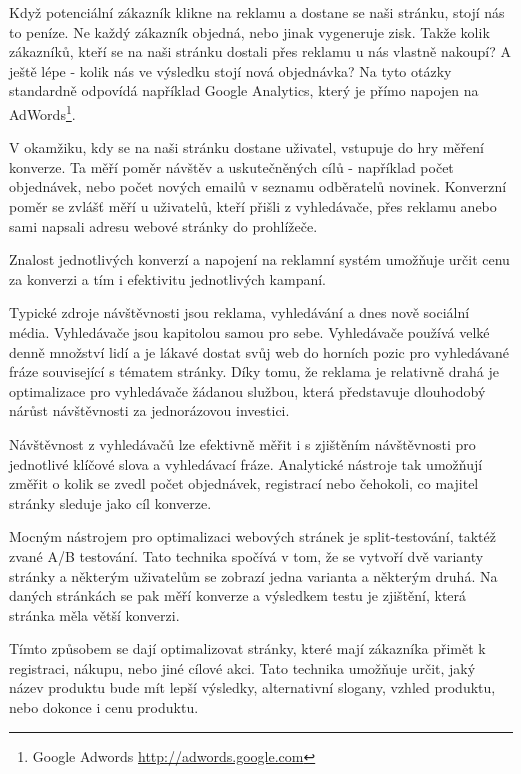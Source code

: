 \documentclass[bc,male,java,dept456]{diploma}						%
\begin{document}
Když potenciální zákazník klikne na reklamu a dostane se naši stránku, stojí nás to peníze. Ne každý zákazník objedná, nebo jinak vygeneruje zisk. Takže kolik zákazníků, kteří se na naši stránku dostali přes reklamu u nás vlastně nakoupí? A ještě lépe - kolik nás ve výsledku stojí nová objednávka? Na tyto otázky standardně odpovídá například Google Analytics, který je přímo napojen na AdWords\footnote{Google Adwords \url{http://adwords.google.com}}.

V okamžiku, kdy se na naši stránku dostane uživatel, vstupuje do hry měření kon\-ver\-ze\cite{conversions}. Ta měří poměr návštěv a uskutečněných cílů - například počet objednávek, nebo počet nových emailů v seznamu odběratelů novinek. Konverzní poměr se zvlášť měří u uživatelů, kteří přišli z vyhledávače, přes reklamu anebo sami napsali adresu webové stránky do prohlížeče.

Znalost jednotlivých konverzí a napojení na reklamní systém umožňuje určit cenu za konverzi a tím i efektivitu jednotlivých kampaní.





Typické zdroje návštěvnosti jsou reklama, vyhledávání a dnes nově sociální média. Vyhledávače jsou kapitolou samou pro sebe. Vyhledávače používá velké denně množství lidí a je lákavé dostat svůj web do horních pozic pro vyhledávané fráze související s tématem stránky. Díky tomu, že reklama je relativně drahá je optimalizace pro vyhledávače žádanou službou, která představuje dlouhodobý nárůst návštěvnosti za jednorázovou investici.

Návštěvnost z vyhledávačů lze efektivně měřit i s zjištěním návštěvnosti pro jednotlivé klíčové slova a vyhledávací fráze. Analytické nástroje tak umožňují změřit o kolik se zvedl počet objednávek, registrací nebo čehokoli, co majitel stránky sleduje jako cíl konverze.



Mocným nástrojem pro optimalizaci webových stránek je split-testování, taktéž zvané A/B testování. Tato technika spočívá v tom, že se vytvoří dvě varianty stránky a něk\-te\-rým uživatelům se zobrazí jedna varianta a některým druhá. Na daných stránkách se pak měří konverze a výsledkem testu je zjištění, která stránka měla větší konverzi.

Tímto způsobem se dají optimalizovat stránky, které mají zákazníka přimět k registraci, nákupu, nebo jiné cílové akci. Tato technika umožňuje určit, jaký název produktu bude mít lepší výsledky, alternativní slogany, vzhled produktu, nebo dokonce i cenu produktu. 
\end{document}
